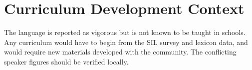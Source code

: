 \documentclass[12pt]{article}
\begin{document}
\section{Curriculum Development Context}
The language is reported as vigorous but is not known to be taught in schools. Any curriculum would have to begin from the SIL survey and lexicon data, and would require new materials developed with the community. The conflicting speaker figures should be verified locally.
\end{document}
